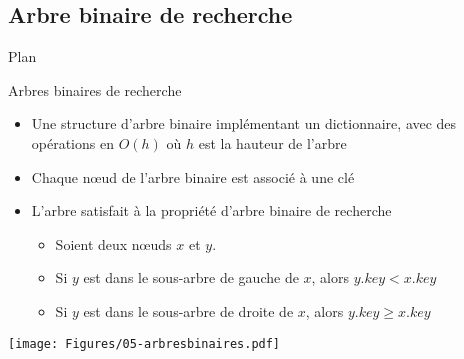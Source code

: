 \subsection{Arbre binaire de recherche}

\begin{frame}{Plan}

\tableofcontents[currentsection]

\end{frame}


\begin{frame}{Arbres binaires de recherche}

\begin{itemize}
\item Une structure d'arbre binaire implémentant un dictionnaire, avec
  des opérations en $O(h)$ où $h$ est la hauteur de l'arbre


\bigskip

\item Chaque n\oe ud de l'arbre binaire est associé à une clé
\item L'arbre satisfait à la propriété d'arbre binaire de recherche
\begin{itemize}
\item Soient deux n\oe uds $x$ et $y$.
\item Si $y$ est dans le sous-arbre de gauche de $x$, alors $y.key<x.key$
\item Si $y$ est dans le sous-arbre de droite de $x$, alors $y.key\geq x.key$
\end{itemize}
\end{itemize}

\centerline{\texttt{[image: Figures/05-arbresbinaires.pdf]}}

\end{frame}

